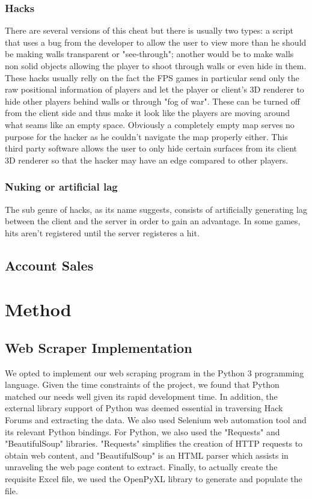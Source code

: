 \documentclass[sigconf]{acmart}
\begin{document}
\subsubsection{Hacks}
There are several versions of this cheat but there is usually two types: a script that uses a bug from the
developer to allow the user to view more than he should be making walls transparent or "see-through"; another would be to make walls non solid objects allowing the player to shoot through walls or even hide in them. These hacks usually relly on the fact the FPS games in particular send only the raw positional information of players and let the player or client's 3D renderer to hide other players behind walls or through "fog of war". These can be turned off from the client side and thus make it look like the players are moving around what seams like an empty space. Obviously a completely empty map serves no purpose for the hacker as he couldn't navigate the map properly either. This third party software allows the user to only hide certain surfaces from its client 3D renderer so that the hacker may have an edge compared to other players.

\subsubsection{Nuking or artificial lag}
The sub genre of hacks, as its name suggests, consists of artificially generating lag between the client and the server in order to gain an advantage. In some games, hits aren't registered until the server registeres a hit. 

\subsection{Account Sales}


\section{Method}

\subsection{Web Scraper Implementation}
We opted to implement our web scraping program in the Python 3 programming
language. Given the time constraints of the project, we found that Python
matched our needs well given its rapid development time. In addition, the 
external library support of Python was deemed essential in traversing
Hack Forums and extracting the data. We also used Selenium web automation tool
and its relevant Python bindings. For Python, we also used the "Requests" and 
"BeautifulSoup" libraries. "Requests" simplifies the creation of HTTP requests 
to obtain web content, and "BeautifulSoup" is an HTML parser which assists
in unraveling the web page content to extract. Finally, to actually create
the requisite Excel file, we used the OpenPyXL library to generate and
populate the file. 
\end{document}
